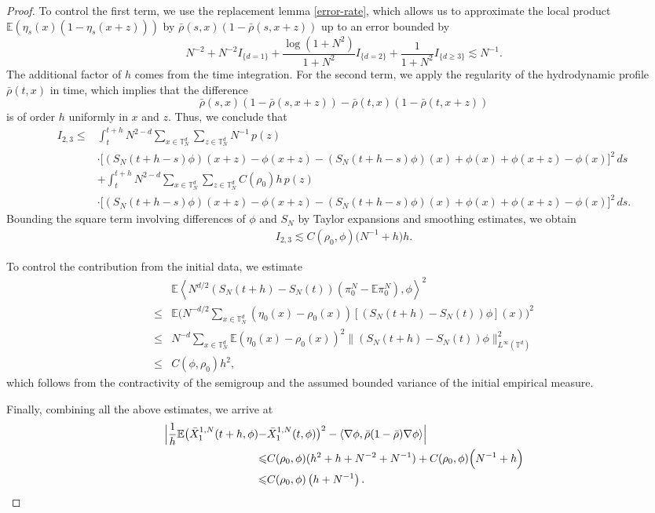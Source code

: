 \documentclass[UTF-8,reqno]{amsart}
\numberwithin{equation}{section}
\def\leq{\leqslant}
\def\ge{\geqslant}
\def\leq{\leqslant}
\def\ge{\geqslant}
\begin{document}
\begin{proof}
To control the first term, we use the replacement lemma \ref{error-rate}, which allows us to approximate the local product $\mathbb{E}(\eta_s(x)(1 - \eta_s(x+z)))$ by $\bar{\rho}(s,x)(1 - \bar{\rho}(s,x+z))$ up to an error bounded by $$N^{-2}+N^{-2}I_{\{d=1\}}+\frac{\log(1+N^2)}{1+N^2}I_{\{d=2\}}+\frac{1}{1+N^2}I_{\{d\ge3\}}\lesssim N^{-1}.$$ The additional factor of $h$ comes from the time integration. For the second term, we apply the regularity of the hydrodynamic profile $\bar{\rho}(t,x)$ in time, which implies that the difference $$\bar{\rho}(s,x)(1 - \bar{\rho}(s,x+z)) - \bar{\rho}(t,x)(1 - \bar{\rho}(t,x+z))$$ is of order $h$ uniformly in $x$ and $z$. Thus, we conclude that 
\begin{align*}
I_{2,3}\leq & \int_t^{t+h} N^{2-d} \sum_{x \in \mathbb{T}^d_N} \sum_{z \in \mathbb{T}^d_N}  N^{-1}  \, p(z) \\
& \cdot \Big[(S_N(t+h-s)\phi)(x+z) - \phi(x+z) - (S_N(t+h-s)\phi)(x)  + \phi(x) + \phi(x+z) - \phi(x) \Big]^2 \, ds \\
& + \int_t^{t+h} N^{2-d} \sum_{x \in \mathbb{T}^d_N} \sum_{z \in \mathbb{T}^d_N} C(\rho_0) h \, p(z) \\
& \cdot \Big[(S_N(t+h-s)\phi)(x+z) - \phi(x+z) - (S_N(t+h-s)\phi)(x) + \phi(x) + \phi(x+z) - \phi(x) \Big]^2 \, ds.
\end{align*}
Bounding the square term involving differences of $\phi$ and $S_N$ by Taylor expansions and smoothing estimates, we obtain
\begin{align*}
I_{2,3} \lesssim C(\rho_0, \phi) \Big(  N^{-1} + h \Big)h.
\end{align*}

To control the contribution from the initial data, we estimate
\begin{align*}
&\mathbb{E} \left\langle N^{d/2}(S_N(t+h) - S_N(t)) (\pi^N_0 - \mathbb{E}\pi^N_0), \phi \right\rangle^2\\
\leq&\mathbb{E}\Big(N^{-d/2}\sum_{x\in\mathbb{T}^d_N}(\eta_0(x)-\rho_0(x))[(S_N(t+h) - S_N(t))\phi](x)\Big)^2\\
\leq&N^{-d}\sum_{x\in\mathbb{T}^d_N}\mathbb{E}(\eta_0(x)-\rho_0(x))^2\|(S_N(t+h) - S_N(t))\phi\|_{L^{\infty}(\mathbb{T}^d)}^2\\
\leq& C(\phi,\rho_0) h^2,
\end{align*}
which follows from the contractivity of the semigroup and the assumed bounded variance of the initial empirical measure.

Finally, combining all the above estimates, we arrive at
\begin{align}
\Big| \frac{1}{h} \mathbb{E} \big(\bar{X}^{1,N}_1(t+h, \phi) - &\bar{X}^{1,N}_1(t, \phi)\big)^2 - \langle \nabla \phi, \bar{\rho}(1 - \bar{\rho}) \nabla \phi \rangle \Big|\notag\\
 \leq& C(\rho_0, \phi)(h^2 + h + N^{-2}+N^{-1})     + C(\rho_0, \phi) \Big(  N^{-1} + h \Big)\notag\\
\leq& C(\rho_0,\phi)\left(h +N^{-1}\right). 
\end{align}


\end{proof}
\end{document}
